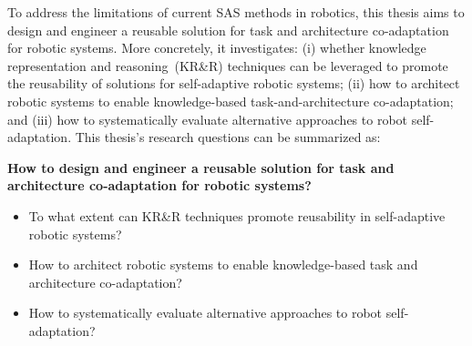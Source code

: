 To address the limitations of current SAS methods in robotics, this thesis aims to design and engineer a reusable solution for task and architecture co-adaptation for robotic systems. More concretely, it investigates: (i) whether knowledge representation and reasoning~(KR\&R) techniques can be leveraged to promote the reusability of solutions for self-adaptive robotic systems; (ii) how to architect robotic systems to enable knowledge-based task-and-architecture co-adaptation; and (iii) how to systematically evaluate alternative approaches to robot self-adaptation. This thesis's research questions can be summarized as:

\begin{tcolorbox}[colframe=tudelft-cyan, colback=white, title=Research questions]
\noindent\textbf{How to design and engineer a reusable solution for task and architecture co-adaptation for robotic systems?}
\begin{itemize}[label={}]
  \item[\textbf{RQ1.1}] To what extent can KR\&R techniques promote reusability in self-adaptive robotic systems?
  \item[\textbf{RQ1.2}] How to architect robotic systems to enable knowledge-based task and architecture co-adaptation?
  \item[\textbf{RQ1.3}] How to systematically evaluate alternative approaches to robot self-adaptation?
\end{itemize}
\end{tcolorbox}



